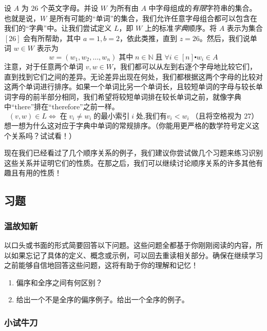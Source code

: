 \begin{example}
    设 $A$ 为 $26$ 个英文字母。并设 $W$ 为所有由 $A$ 中字母组成的\emph{有限}字符串的集合。也就是说，$W$ 是所有可能的``单词''的集合，我们允许任意字母组合都可以包含在我们的``字典''中。让我们尝试定义 $L$，即 $W$ 上的标准\emph{字典}顺序。将 $A$ 表示为集合 $[26]$ 会有所帮助，其中 $a = 1, b = 2$，依此类推，直到 $z = 26$。然后，我们说单词 $w \in W$ 表示为
    \[w = (w_1, w_2, \dots , w_n) \;\text{其中}\; n \in \mathbb{N} \;\text{且}\; \forall i \in [n] \centerdot w_i \in A\]
    注意，对于任意两个单词 $v, w \in W$，我们都可以从左到右逐个字母地比较它们，直到找到它们之间的差异。无论差异出现在何处，我们都根据这两个字母的比较对这两个单词进行排序。如果一个单词比另一个单词长，且较短单词的字母与较长单词字母的前半部分相同，我们希望将较短单词排在较长单词之前，就像字典中``there''排在``therefore''之前一样。
    \[(v, w) \in L \iff \;\text{在}\; v_i \ne w_i \;\text{的最小索引}\; i \;\text{处,我们有} v_i < w_i \;\text{（且将空格视为 27）}\]
    想一想为什么这对应于字典中单词的常规排序。（你能用更严格的数学符号定义这个关系吗？试试看！）
\end{example}

现在我们已经看过了几个顺序关系的例子，我们建议你尝试做几个习题来练习识别这些关系并证明它们的性质。在那之后，我们可以继续讨论顺序关系的许多其他有趣且有用的性质！

\newpage

\subsection{习题}

\subsubsection*{温故知新}

以口头或书面的形式简要回答以下问题。这些问题全都基于你刚刚阅读的内容，所以如果忘记了具体的定义、概念或示例，可以回去重读相关部分。确保在继续学习之前能够自信地回答这些问题，这将有助于你的理解和记忆！

\begin{enumerate}[label=(\arabic*)]
    \item 偏序和全序之间有何区别？
    \item 给出一个不是全序的偏序例子。给出一个全序的例子。
\end{enumerate}

\subsubsection*{小试牛刀}

